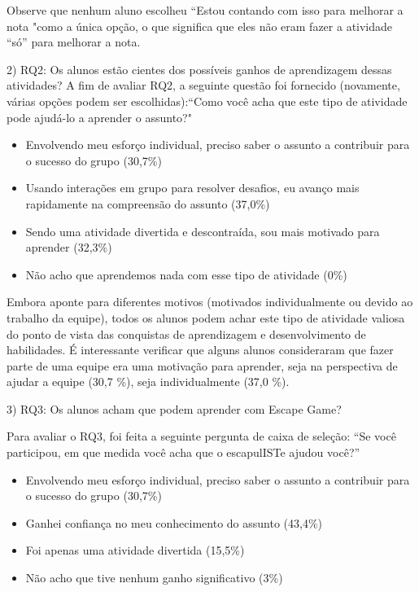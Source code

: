 Observe que nenhum aluno escolheu “Estou contando com isso para melhorar a nota "como a única opção, o que significa que eles não eram
fazer a atividade “só” para melhorar a nota.

2) RQ2: Os alunos estão cientes dos possíveis ganhos de aprendizagem dessas atividades?
A fim de avaliar RQ2, a seguinte questão foi fornecido (novamente, várias opções podem ser escolhidas):“Como você acha que este tipo de atividade pode ajudá-lo a aprender o assunto?"

\begin{itemize}
    \item Envolvendo meu esforço individual, preciso saber o assunto a contribuir para o sucesso do grupo (30,7\%)
    \item Usando interações em grupo para resolver desafios, eu avanço mais rapidamente na compreensão do assunto (37,0\%)
    \item Sendo uma atividade divertida e descontraída, sou mais motivado para aprender (32,3\%)
    \item Não acho que aprendemos nada com esse tipo de atividade (0\%)
\end{itemize}

Embora aponte para diferentes motivos (motivados individualmente ou devido ao trabalho da equipe), todos os alunos podem achar este tipo de atividade valiosa do ponto de vista das conquistas de aprendizagem e desenvolvimento de habilidades. É interessante verificar que alguns alunos consideraram que fazer parte de uma equipe era uma motivação para aprender, seja na perspectiva de ajudar a equipe (30,7 \%), seja individualmente (37,0 \%).

3) RQ3: Os alunos acham que podem aprender com Escape Game? 

Para avaliar o RQ3, foi feita a seguinte pergunta de caixa de seleção: “Se você participou, em que medida você acha que o escapulISTe ajudou você?”

\begin{itemize}
    \item Envolvendo meu esforço individual, preciso saber o assunto a contribuir para o sucesso do grupo (30,7\%)
    \item Ganhei confiança no meu conhecimento do assunto (43,4\%)
    \item Foi apenas uma atividade divertida (15,5\%)
    \item Não acho que tive nenhum ganho significativo (3\%) 
\end{itemize}

